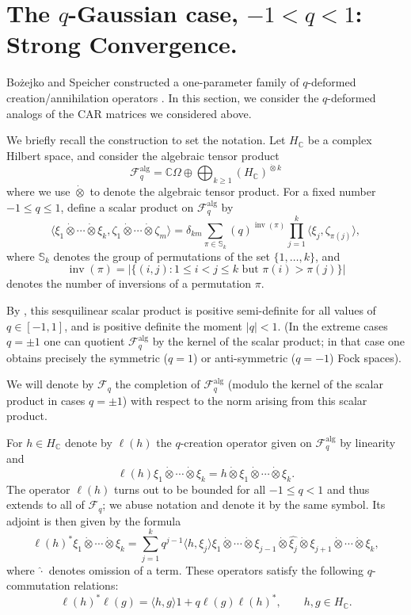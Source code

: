 \documentclass[11pt]{article}
\newcommand{\atimes}{\dot{\otimes}}
\begin{document}
\section{The $q$-Gaussian case, $-1<q<1$: Strong Convergence.}
Bo\.zejko and Speicher constructed a one-parameter family of $q$-deformed creation/annihilation operators \cite{Bozejko-Speicher:qBrownian}. 
In this section, we consider the $q$-deformed analogs of the CAR matrices we considered above.  

We briefly recall the construction to set the notation.  Let $H_\mathbb{C}$ be a complex Hilbert space, and consider the algebraic tensor product 
\[
\mathscr{F}_q^{\operatorname{alg}} = \mathbb{C}\Omega \oplus \bigoplus_{k\geq 1} 
(H_\mathbb{C})^{\atimes k} 
\]
where we use $\atimes$ to denote the algebraic tensor product.  For a fixed number $-1\leq q\leq 1$, define a scalar product on $\mathscr{F}_q^{\operatorname{alg}}$ by \[
\langle \xi_1\atimes \cdots \atimes \xi_k ,\zeta_1\atimes \cdots \atimes \zeta_m\rangle 
= \delta_{km} \sum_{\pi \in \mathbb{S}_k} (q)^{\operatorname{inv}(\pi)}  \prod_{j=1}^k \langle \xi_j, \zeta_{\pi(j)}\rangle,
\]
where $\mathbb{S}_k$ denotes the group of permutations of the set $\{1,\dots,k\}$, and \[
\operatorname{inv}(\pi)=\bigl|\{(i,j): 1\leq i< j\leq k \textrm{ but } \pi(i)>\pi(j)\}\bigr|\] denotes the number of inversions of a permutation $\pi$. 

By \cite[Proposition 1]{Bozejko-Speicher:qBrownian}, this sesquilinear scalar product is positive semi-definite for all values of $q\in [-1,1]$, and is positive definite the moment $|q|<1$.  (In the extreme cases $q=\pm 1$ one can quotient $\mathscr{F}_q^{\operatorname{alg}}$ by the kernel of the scalar product; in that case one obtains precisely the symmetric ($q=1$) or anti-symmetric ($q=-1$) Fock spaces).

We will denote by $\mathscr{F}_q$ the completion of $\mathscr{F}_q^{\operatorname{alg}}$ (modulo the kernel of the scalar product in cases $q=\pm 1$) with respect to the norm arising from this scalar product.



For $h\in H_\mathbb{C}$ denote by $\ell(h)$ the $q$-creation operator given on $\mathscr{F}_q^{\operatorname{alg}}$ by linearity and 
\[
\ell(h) \xi_1\atimes \cdots \atimes \xi_k = h\atimes \xi_1\atimes \cdots \atimes \xi_k.
\]
The operator $\ell(h)$ turns out to be bounded for all $-1\leq q<1$ and thus extends to all of $\mathscr{F}_q$; we abuse notation and denote it by the same symbol. Its adjoint is then given by the formula
\[
\ell(h)^* \xi_1\atimes\cdots\atimes \xi_k = \sum_{j=1}^{k} q^{j-1} \langle h,\xi_j\rangle \xi_1\atimes\cdots 
\atimes \xi_{j-1} \atimes \widehat{\xi_j} \atimes \xi_{j+1}\atimes\cdots \atimes \xi_k, 
\]
where $\widehat{\cdot}$ denotes omission of a term.  These operators satisfy the following $q$-commutation relations: \begin{equation} \label{eq:qCommutation}
\ell(h)^*\ell(g) = \langle h,g\rangle 1  + q \ell(g) \ell(h)^*,\qquad h,g\in H_\mathbb{C}.
\end{equation}
\end{document}
